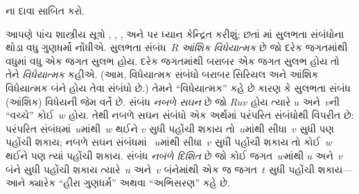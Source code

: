 \begin{prob}
  ના દાવા સાબિત કરો.
\end{prob}

આપણે પાંચ શાસ્ત્રીય સૂત્રો ,
, ,  અને  પર ધ્યાન કેન્દ્રિત
કરીશું; છતાં માં સુલભતા
સંબંધોના થોડા વધુ ગુણધર્મો નોંધીએ. સુલભતા
સંબંધ~$R$ \emph{આંશિક વિધેયાત્મક} છે જો દરેક
જગતમાંથી વધુમાં વધુ એક જગત સુલભ હોય. દરેક
જગતમાંથી બરાબર એક જગત સુલભ હોય તો તેને
\emph{વિધેયાત્મક} કહીએ. (આમ, વિધેયાત્મક સંબંધો
બરાબર સિરિયલ અને આંશિક વિધેયાત્મક બંને હોય
તેવા સંબંધો છે.) તેમને ``વિધેયાત્મક'' કહે છે કારણ કે
સુલભતા સંબંધ (આંશિક) વિધેયની જેમ વર્તે છે.
સંબંધ \emph{નબળે સઘન} છે જો $Ruv$ હોય ત્યારે
$u$ અને~$v$ની ``વચ્ચે'' કોઈ~$w$ હોય. તેથી
નબળે સઘન સંબંધો એક અર્થમાં પરંપરિત સંબંધોથી
વિપરીત છે: પરંપરિત સંબંધમાં~$u$માંથી~$w$ થઈને
$v$ સુધી પહોંચી શકાય તો~$u$માંથી સીધા~$v$
સુધી પણ પહોંચી શકાય; નબળે સઘન સંબંધમાં
~$u$માંથી સીધા~$v$ સુધી પહોંચી શકાય તો
કોઈ~$w$ થઈને પણ ત્યાં પહોંચી શકાય.
સંબંધ \emph{નબળે દિશિત} છે જો કોઈ જગત~$w$માંથી
$u$ અને~$v$ બંને સુધી પહોંચી શકાય ત્યારે~$u$
અને~$v$ બંનેમાંથી એક જ જગત~$t$ સુધી પહોંચી
શકાય---આને ક્યારેક ``હીરા ગુણધર્મ'' અથવા
``અભિસરણ'' કહે છે.

